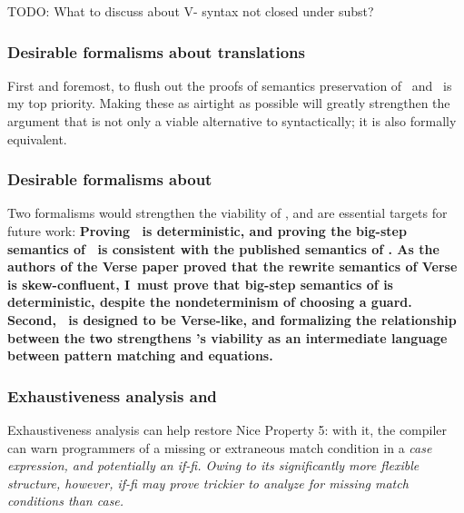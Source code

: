 \documentclass[manuscript,screen,review, 12pt, nonacm]{acmart}
\begin{document}
        TODO: What to discuss about V- syntax not closed under subst? 

        \subsubsection{Desirable formalisms about translations}
        First and foremost, to flush out the proofs of semantics preservation of
        \PTran\ and \DTran\ is my top priority. Making these as airtight as
        possible will greatly strengthen the argument that \VMinus is not only a
        viable alternative to \PPlus syntactically; it is also formally
        equivalent. 

        \subsubsection{Desirable formalisms about \VMinus}
        Two formalisms would strengthen the viability of \VMinus, and are
        essential targets for future work: \bf{Proving \VMinus~is
        deterministic}, and \bf{proving the big-step semantics of \VMinus~is
        consistent with the published semantics of \VC.} As the authors of the
        Verse paper proved that the rewrite semantics of Verse is
        skew-confluent, I~must prove that big-step semantics of \VMinus is
        deterministic, despite the nondeterminism of choosing a guard. Second,
        \VMinus~is designed to be Verse-like, and formalizing the relationship
        between the two strengthens \VMinus's viability as an intermediate
        language between pattern matching and equations. 


        \subsubsection{Exhaustiveness analysis \PPlus and \VMinus}
        \label{typingppandvm}

        Exhaustiveness analysis can help restore Nice Property 5: with it,
        the compiler can warn programmers of a missing or extraneous match
        condition in a \it{case} expression, and potentially an \it{if-fi}.
        Owing to its significantly more flexible structure, however, \it{if-fi}
        may prove trickier to analyze for missing match conditions than
        \it{case}.

\end{document}
